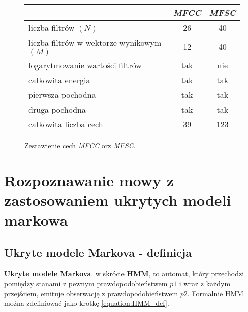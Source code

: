 \documentclass[11pt]{article}
\begin{document}
	\begin{figure}
		\begin{center}
			\begin{tabular}{|l|c|c|}
				\hline
				                                          & \textit{MFCC} & \textit{MFSC} \\ 
                \hline
				liczba filtrów $(N)$                      &       26      &      40       \\
				liczba filtrów w wektorze wynikowym $(M)$ &       12      &      40       \\  
				logarytmowanie wartości filtrów           &       tak     &      nie      \\
				całkowita energia                         &       tak     &      tak      \\
				pierwsza pochodna                         &       tak     &      tak      \\
				druga pochodna                            &       tak     &      tak      \\
				całkowita liczba cech                     &       39      &      123      \\
				\hline
				
			\end{tabular}			
		\end{center}
		\label{fig:feature_comparision}
		\caption{Zestawienie cech \textit{MFCC} orz \textit{MFSC}.}
	\end{figure}
	

\section {Rozpoznawanie mowy z zastosowaniem ukrytych modeli markowa}
	\label{sec:ASR_HMM}
    \subsection{Ukryte modele Markova - definicja}
	    \label{sec:hmm_def}
    
	    \textbf{Ukryte modele Markova}, w skrócie \textbf{HMM}, to automat, który przechodzi pomiędzy stanami z pewnym prawdopodobieństwem $p1$ i wraz z każdym przejściem, emituje obserwację z prawdopodobieństwem $p2$. Formalnie HMM można zdefiniować jako krotkę \ref{equation:HMM_def}.
	    
\end{document}
